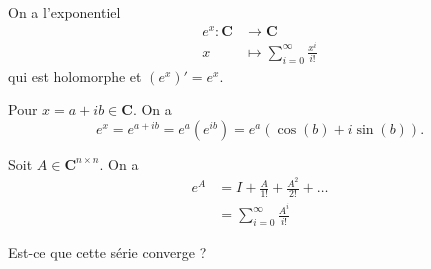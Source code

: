 \begin{reminder}
On a l'exponentiel 
\begin{align*}
e^{x}:\mathbf{C} & \to \mathbf{C} \\
x & \mapsto \sum_{i=0}^{\infty} \frac{x^{i}}{i!} 
\end{align*}
qui est holomorphe et $(e^{x})'=e^{x}$.

Pour $x=a+ib\in \mathbf{C}$. On a 
$$
e^{x}=e^{ a+ib }=e^{a}(e^{ ib })=e^{ a }(\cos(b)+i\sin(b)).
$$
\end{reminder}

Soit $A\in \mathbf{C}^{n\times n}$. On a
\begin{align*}
e^{A} & =I + \frac{A}{1!}+\frac{A^{2}}{2!}+\dots \\
 & =\sum_{i=0}^{\infty} \frac{A^{i}}{i!}
\end{align*}
\begin{question}
Est-ce que cette série converge ?
\end{question}
